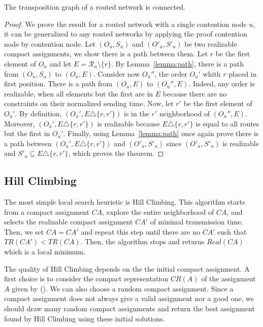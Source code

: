  \begin{theorem}
 The transposition graph of a routed network is connected.
 \end{theorem}
 \begin{proof}
 We prove the result for a routed network with a single contention node $u$, it can be generalized to any routed networks 
 by applying the proof contention node by contention node. Let $(O_u,S_u)$ and $(O'_u,S'_u)$ be two realizable compact assignments, we show there is a path between them. Let $r$ be the first element of 
$O_u$ and let $E = \mathcal{R}_u \setminus \{ r \}$. By Lemma~\ref{lemma:path}, there is a path from 
$(O_u,S_u)$ to $(O_u,E)$. Consider now $O_u''$, the order $O_u'$ whith $r$ placed in first position.
There is a path from $(O_u,E)$ to $(O_u'',E)$. Indeed, any order is realizable, when all elements but the first
are in $E$ because there are no constraints on their normalized sending time. 
Now, let $r'$ be the first element of $O_u'$. By definition, $(O_u',E \triangle \{r,r'\})$ is in the $r'$ neighborhood of $(O_u'',E)$. Moreover, $(O_u',E \triangle \{r,r'\})$ is realizable because $E \triangle \{r,r'\}$ is equal to all routes but the first in $O_u'$. 
Finally, using Lemma~\ref{lemma:path} once again prove there is a path between $(O_u',E \triangle \{r,r'\})$ and $(O'_u,S'_u)$ since $(O'_u,S'_u)$ is realizable and $S'_u \subseteq E \triangle \{r,r'\}$, which proves the theorem.
 \end{proof}




\subsection{Hill Climbing}

The most simple local search heuristic is Hill Climbing. This algorithm starts from a compact assignment $CA$, explore the entire neighborhood of $CA$, and selects the realizable compact assignment $CA'$ of minimal transmission time. Then, we set $CA = CA'$ and repeat this step until there are no $CA'$ such that $TR(CA') < TR(CA)$. Then, the algorithm stops and returns $Real(CA)$ which is a local minimum. 

The quality of Hill Climbing depends on the the initial compact assignment. A first choice is to consider the compact representation $CR(A)$ of the assignment $A$ given by \hybridgreedynormalized (\hgn). We can also choose a random compact assignment. Since a compact assignment does not always give a valid assignment nor a good one, we should draw many random compact assignments and return the best assignment found by Hill Climbing using these initial solutions.

